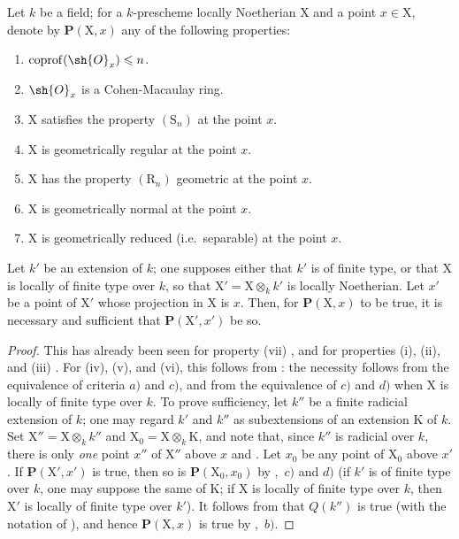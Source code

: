 \begin{corollary}[6.7.8]
\label{IV.6.7.8}
Let $k$ be a field; for a $k$-prescheme locally Noetherian $\mathrm{X}$ and a point $x\in\mathrm{X}$, denote by $\boldsymbol{P}(\mathrm{X},x)$ any of the following properties:
\begin{enumerate}[label=(\roman*)]
  \item $\operatorname{coprof}(\sh{O}_x)\leqslant n$.
  \item $\sh{O}_x$ is a Cohen-Macaulay ring.
  \item $\mathrm{X}$ satisfies the property $(\mathrm{S}_n)$ at the point $x$.
  \item $\mathrm{X}$ is geometrically regular at the point $x$.
  \item $\mathrm{X}$ has the property $(\mathrm{R}_n)$ geometric at the point $x$.
  \item $\mathrm{X}$ is geometrically normal at the point $x$.
  \item $\mathrm{X}$ is geometrically reduced (i.e.\ separable) at the point $x$.
\end{enumerate}
Let $k'$ be an extension of $k$; one supposes either that $k'$ is of finite type, or that $\mathrm{X}$ is locally of finite type over $k$, so that $\mathrm{X}'=\mathrm{X}\otimes_k k'$ is locally Noetherian. Let $x'$ be a point of $\mathrm{X}'$ whose projection in $\mathrm{X}$ is $x$. Then, for $\boldsymbol{P}(\mathrm{X},x)$ to be true, it is necessary and sufficient that $\boldsymbol{P}(\mathrm{X}',x')$ be so.
\end{corollary}

\begin{proof}
This has already been seen for property (vii) , and for properties (i), (ii), and (iii) . For (iv), (v), and (vi), this follows from : the necessity follows from the equivalence of criteria $a)$ and $c)$, and from the equivalence of $c)$ and $d)$ when $\mathrm{X}$ is locally of finite type over $k$. To prove sufficiency, let $k''$ be a finite radicial extension of $k$; one may regard $k'$ and $k''$ as subextensions of an extension $\mathrm{K}$ of $k$. Set $\mathrm{X}''=\mathrm{X}\otimes_k k''$ and $\mathrm{X}_0=\mathrm{X}\otimes_k\mathrm{K}$, and note that, since $k''$ is radicial over $k$, there is only \emph{one} point $x''$ of $\mathrm{X}''$ above $x$  and . Let $x_0$ be any point of $\mathrm{X}_0$ above $x'$. If $\boldsymbol{P}(\mathrm{X}',x')$ is true, then so is $\boldsymbol{P}(\mathrm{X}_0,x_0)$ by ,~$c)$ and $d)$ (if $k'$ is of finite type over $k$, one may suppose the same of $\mathrm{K}$; if $\mathrm{X}$ is locally of finite type over $k$, then $\mathrm{X}'$ is locally of finite type over $k'$). It follows from  that $Q(k'')$ is true (with the notation of ), and hence $\boldsymbol{P}(\mathrm{X},x)$ is true by ,~$b)$.
\end{proof}

